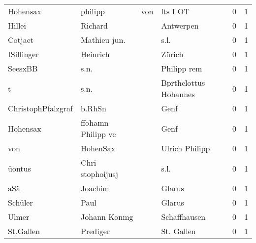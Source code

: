 \begin{tabular}{llllrr}
                 Hohensax &                            philipp &         von &                                    lts I OT &          0 &         1 \\
                   Hillei &                            Richard &             &                                   Antwerpen &          0 &         1 \\
                  Cotjaet &                       Mathieu jun. &             &                                        s.l. &          0 &         1 \\
               ISillinger &                           Heinrich &             &                                      Zürich &          0 &         1 \\
                  SeesxBB &                               s.n. &             &                                 Philipp rem &          0 &         1 \\
                        t &                               s.n. &             &                       Bprthelottus Hohannes &          0 &         1 \\
       ChristophPfalzgraf &                             b.RhSn &             &                                        Genf &          0 &         1 \\
                 Hohensax &                 ffohamn Philipp vc &             &                                        Genf &          0 &         1 \\
                      von &                           HohenSax &             &                              Ulrich Philipp &          0 &         1 \\
                   üontus &                   Chri stophoijusj &             &                                        s.l. &          0 &         1 \\
                      aSä &                            Joachim &             &                                      Glarus &          0 &         1 \\
                  Schüler &                               Paul &             &                                      Glarus &          0 &         1 \\
                    Ulmer &                       Johann Konmg &             &                                Schaffhausen &          0 &         1 \\
                St.Gallen &                           Prediger &             &                                  St. Gallen &          0 &         1 \\

\end{tabular}
